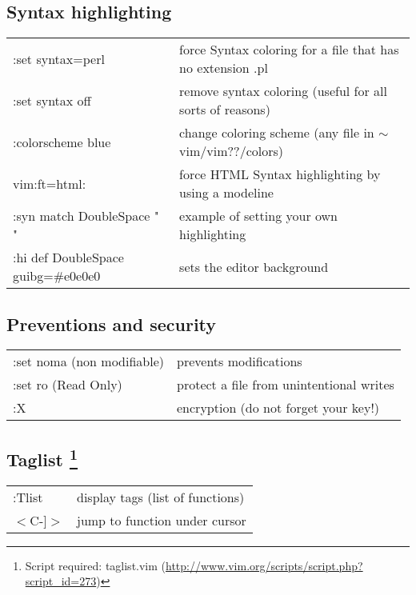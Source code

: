 \subsection{Syntax highlighting}
\begin{center}
\begin{longtable}{l|l}
 :set syntax=perl & force Syntax coloring for a file that has no extension .pl\\
 :set syntax off & remove syntax coloring (useful for all sorts of reasons)\\
 :colorscheme blue & change coloring scheme (any file in $\sim$vim/vim??/colors)\\
 vim:ft=html: & force HTML Syntax highlighting by using a modeline\\
 :syn match DoubleSpace " " & example of setting your own highlighting\\
 :hi def DoubleSpace guibg=\#e0e0e0 & sets the editor background
\end{longtable}
\end{center}

\subsection{Preventions and security}
\begin{center}
\begin{longtable}{l|l}
 :set noma (non modifiable) & prevents modifications\\
 :set ro (Read Only) & protect a file from unintentional writes\\
 :X & encryption (do not forget your key!)
\end{longtable}
\end{center}

\subsection[Taglist]
{Taglist \footnote{Script required: taglist.vim (\href{http://www.vim.org/scripts/script.php?script\_id=273}{http://www.vim.org/scripts/script.php?script\_id=273})}}

\begin{center}
\begin{longtable}{l|l}
:Tlist & display tags (list of functions)\\
$<$C-]$>$  & jump to function under cursor
\end{longtable}
\end{center}

